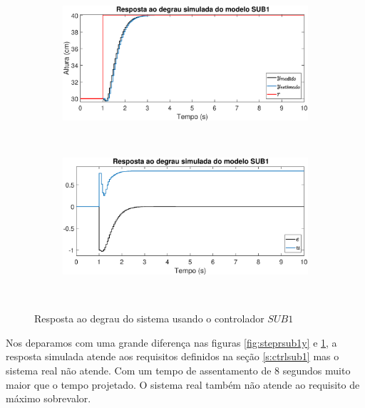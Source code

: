 \begin{figure}[htb]
	\centering
	\begin{subfigure}[t]{0.48\textwidth}
		\includegraphics[width=1\linewidth]{pasta1_figuras/stepssub1y}
		\label{fig:stepssub1y}
	\end{subfigure}
	~ %
	\begin{subfigure}[t]{0.48\textwidth}
		\includegraphics[width=1\linewidth]{pasta1_figuras/stepssub1e}
		\label{fig:stepssub1e}
	\end{subfigure}
	~ %
	
	\caption{Resposta ao degrau do sistema usando o controlador $SUB1$}\label{fig:stepssub1}
\end{figure}

Nos deparamos com uma grande diferença nas figuras \ref{fig:steprsub1y} e \ref{fig:stepssub1y}, a resposta simulada atende aos requisitos definidos na seção \ref{s:ctrlsub1} mas o sistema real não atende. Com um tempo de assentamento de 8 segundos muito maior que o tempo projetado. O sistema real também não atende ao requisito de máximo sobrevalor. 

